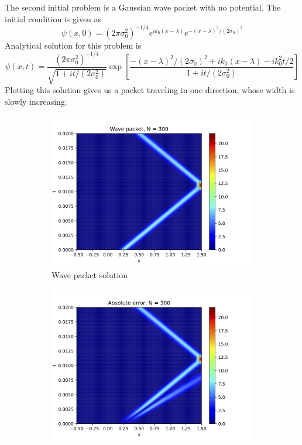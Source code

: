 \documentclass[12pt, a4paper]{article}
\begin{document}
The second initial problem is a Gaussian wave packet with no potential. The initial condition is given as
\begin{equation*}
  \psi(x,0)=(2\pi \sigma_0^2)^{-1/4} e^{i k_0(x-\lambda)}e^{-(x-\lambda)^2/(2\sigma_0)^2}
\end{equation*}
Analytical solution for this problem is
\begin{equation*}
  \psi(x,t)=\frac{(2\pi \sigma_0^2)^{-1/4}}{\sqrt{1+i t/(2\sigma_0^2)}} \exp\left[
    \frac{-(x-\lambda)^2/(2\sigma_0)^2+i k_0(x-\lambda)-i k_0^2 t/2}{1+i t/(2\sigma_0^2)}
    \right]
\end{equation*}
Plotting this solution gives us a packet traveling in one direction, whose width is slowly increasing.

\begin{figure}[hbtp]
  \begin{subfigure}{0.5\textwidth}
  \includegraphics[width=\linewidth]{gauss_odboj copy.png}
  \caption{Wave packet solution} \label{fig:a}
  \end{subfigure}
  \hspace*{\fill}
  \begin{subfigure}{0.5\textwidth}
  \includegraphics[width=\linewidth]{gauss_error_odboj copy.png}

\end{subfigure}
\end{figure}
\end{document}
